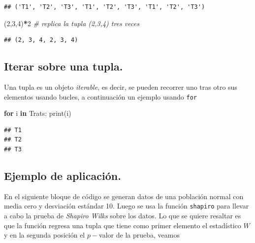 \documentclass[
]{book}
\newenvironment{Shaded}{\begin{snugshade}}{\end{snugshade}}
\newcommand{\BuiltInTok}[1]{#1}
\newcommand{\CommentTok}[1]{\textcolor[rgb]{0.56,0.35,0.01}{\textit{#1}}}
\newcommand{\ControlFlowTok}[1]{\textcolor[rgb]{0.13,0.29,0.53}{\textbf{#1}}}
\newcommand{\DecValTok}[1]{\textcolor[rgb]{0.00,0.00,0.81}{#1}}
\newcommand{\KeywordTok}[1]{\textcolor[rgb]{0.13,0.29,0.53}{\textbf{#1}}}
\newcommand{\NormalTok}[1]{#1}
\newcommand{\OperatorTok}[1]{\textcolor[rgb]{0.81,0.36,0.00}{\textbf{#1}}}
\theoremstyle{definition}
\theoremstyle{definition}
\theoremstyle{definition}
\theoremstyle{definition}
\theoremstyle{remark}
\begin{document}
\begin{verbatim}
## ('T1', 'T2', 'T3', 'T1', 'T2', 'T3', 'T1', 'T2', 'T3')
\end{verbatim}

\begin{Shaded}
\begin{Highlighting}[]
\NormalTok{(}\DecValTok{2}\NormalTok{,}\DecValTok{3}\NormalTok{,}\DecValTok{4}\NormalTok{)}\OperatorTok{*}\DecValTok{2}       \CommentTok{\# replica la tupla (2,3,4) tres veces }
\end{Highlighting}
\end{Shaded}

\begin{verbatim}
## (2, 3, 4, 2, 3, 4)
\end{verbatim}

\hypertarget{iterar-sobre-una-tupla.}{%
\subsection{Iterar sobre una tupla.}\label{iterar-sobre-una-tupla.}}

Una tupla es un objeto \emph{iterable}, es decir, se pueden recorrer uno tras otro sus elementos usando bucles, a continuación un ejemplo usando \texttt{for}

\begin{Shaded}
\begin{Highlighting}[]
\ControlFlowTok{for}\NormalTok{ i }\KeywordTok{in}\NormalTok{ Trats:}
    \BuiltInTok{print}\NormalTok{(i) }
\end{Highlighting}
\end{Shaded}

\begin{verbatim}
## T1
## T2
## T3
\end{verbatim}

\hypertarget{ejemplo-de-aplicaciuxf3n.}{%
\subsection{Ejemplo de aplicación.}\label{ejemplo-de-aplicaciuxf3n.}}

En el siguiente bloque de código se generan datos de una población normal con media cero y desviación estándar 10. Luego se usa la función \texttt{shapiro} para llevar a cabo la prueba de
\emph{Shapiro Wilks} sobre los datos. Lo que se quiere resaltar es que la función regresa una tupla que tiene como primer elemento el estadístico \(W\) y en la segunda posición el \(p-\)valor de la prueba, veamos
\end{document}
